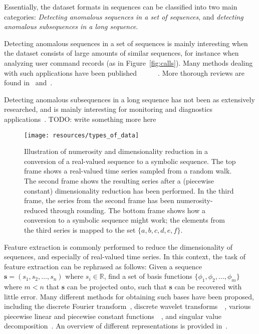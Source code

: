 Essentially, the dataset formats in sequences can be classified into two main categories: \emph{Detecting anomalous sequences in a set of sequences}, and \emph{detecting anomalous subsequences in a long sequence}.

Detecting anomalous sequences in a set of sequences is mainly interesting when the dataset consists of large amounts of similar sequences, for instance when analyzing user command records (as in Figure~\ref{fig:calls}). Many methods dealing with such applications have been published~\cite{blender}~\cite{chan}~\cite{ye}~\cite{forrest}~\cite{sekar1}~\cite{sekar2}. More thorough reviews are found in~\cite{chandola2} and~\cite{chandola3}.

Detecting anomalous subsequences in a long sequence has not been as extensively researched, and is mainly interesting for monitoring and diagnostics applications~\cite{TODO}. TODO: write something more here 

\begin{figure}[htb]
  \begin{center}
    \leavevmode
    \texttt{[image: resources/types\_of\_data]}
  \end{center}
  \caption{\small{Illustration of numerosity and dimensionality reduction in a conversion of a real-valued sequence to a symbolic sequence. The top frame shows a real-valued time series sampled from a random walk. The second frame shows the resulting series after a (piecewise constant) dimensionality reduction has been performed. In the third frame, the series from the second frame has been numerosity-reduced through rounding. The bottom frame shows how a conversion to a symbolic sequence might work; the elements from the third series is mapped to the set $\{a,b,c,d,e,f\}$.}}
\label{fig:types_of_data}
\end{figure}

Feature extraction is commonly performed to reduce the dimensionality of sequences, and especially of real-valued time series. In this context, the task of feature extraction can be rephrased as follows: Given a sequence $\mathbf{s} = ( s_1, s_2, \dots, s_n )$ where $s_i \in \mathbb{R}$, find a set of basis functions $\{ \phi_1, \phi_2, \dots, \phi_m \}$ where $m < n$ that $\mathbf{s}$ can be projected onto, such that $\mathbf{s}$ can be recovered with little error. Many different methods for obtaining such bases have been proposed, including the discrete Fourier transform~\cite{faloutsos1}, discrete wavelet transforms~\cite{pong}~\cite{fu}, various piecewise linear and piecewise constant functions~\cite{keogh3}~\cite{geurts}, and singular value decomposition~\cite{keogh3}. An overview of different representations is provided in~\cite{fabian}.


